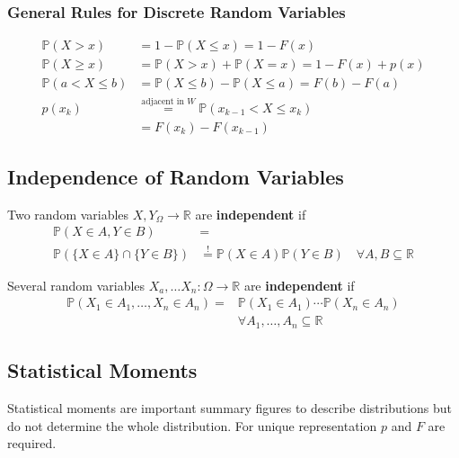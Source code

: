 \subsubsection{General Rules for Discrete Random Variables}
\noindent\begin{align*}
    \mathbb{P}(X>x)       & =1-\mathbb{P}(X\leq x)=1-F(x)                                   \\
    \mathbb{P}(X\geq x)   & =\mathbb{P}(X>x)+\mathbb{P}(X=x)=1-F(x)+p(x)                    \\
    \mathbb{P}(a<X\leq b) & =\mathbb{P}(X\leq b)-\mathbb{P}(X\leq a)=F(b)-F(a)              \\
    p(x_k)                & \overset{\text{adjacent in } W}{=}\mathbb{P}(x_{k-1}<X\leq x_k) \\
                          & =F(x_k)-F(x_{k-1})
\end{align*}

\subsection{Independence of Random Variables}
Two random variables $X,Y_\Omega \rightarrow\mathbb{R}$ are \textbf{independent} if
\noindent\begin{align*}
    \mathbb{P}(X\in A,Y\in B)            & =                                                                                     \\
    \mathbb{P}(\{X\in A\}\cap\{Y\in B\}) & \overset{!}{=}\mathbb{P}(X\in A)\mathbb{P}(Y\in B)\quad\forall A,B\subseteq\mathbb{R}
\end{align*}

Several random variables $X_a, \dots X_n :\Omega\rightarrow\mathbb{R}$ are \textbf{independent} if
\noindent\begin{align*}
    \mathbb{P}(X_1\in A_1,\ldots,X_n\in A_n) = & \mathbb{P}(X_1\in A_1)\cdots\mathbb{P}(X_n\in A_n) \\
                                               & \forall A_1,\ldots,A_n\subseteq\mathbb{R}
\end{align*}

\subsection{Statistical Moments}
Statistical moments are important summary figures to describe distributions but do not determine the whole distribution. For unique representation $p$ and $F$ are required.

